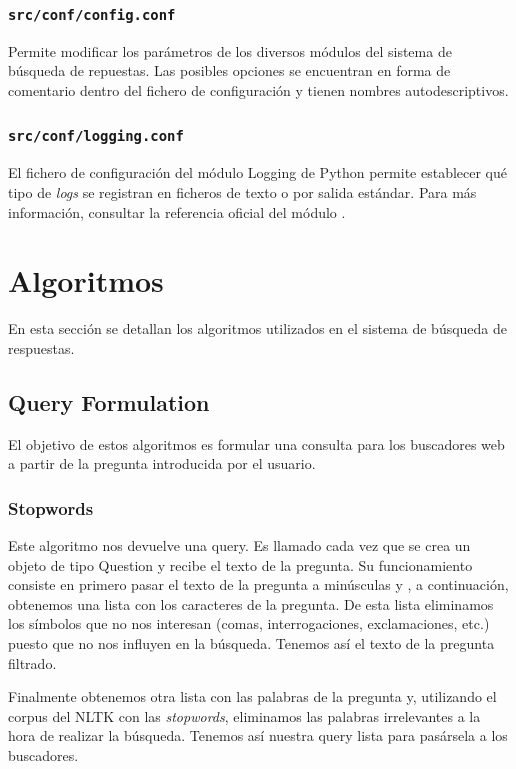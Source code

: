 \documentclass[12pt,a4paper,titlepage]{article}
\begin{document}
\subsubsection{\texttt{src/conf/config.conf}}
Permite modificar los parámetros de los diversos módulos del sistema de búsqueda de repuestas. Las posibles opciones se encuentran en forma de comentario dentro del fichero de configuración y tienen nombres autodescriptivos.

\subsubsection{\texttt{src/conf/logging.conf}}
El fichero de configuración del módulo Logging de Python permite establecer qué tipo de \emph{logs} se registran en ficheros de texto o por salida estándar. Para más información, consultar la referencia oficial del módulo \cite{logging}.

\clearpage
\section{Algoritmos}
En esta sección se detallan los algoritmos utilizados en el sistema de búsqueda de respuestas.

\subsection{Query Formulation}
El objetivo de estos algoritmos es formular una consulta para los buscadores web a partir de la pregunta introducida por el usuario.

\subsubsection{Stopwords}
Este algoritmo nos devuelve una query. Es llamado cada vez que se crea un objeto de tipo Question y recibe el texto de la pregunta. Su funcionamiento consiste en primero pasar el texto de la pregunta a minúsculas y , a continuación, obtenemos una lista con los caracteres de la pregunta. De esta lista eliminamos los símbolos que no nos interesan (comas, interrogaciones, exclamaciones, etc.) puesto que no nos influyen en la búsqueda. Tenemos así el texto de la pregunta filtrado.

Finalmente obtenemos otra lista con las palabras de la pregunta y, utilizando el corpus del NLTK con las \emph{stopwords}, eliminamos las palabras irrelevantes a la hora de realizar la búsqueda. Tenemos así nuestra query lista para pasársela a los buscadores.
\end{document}
